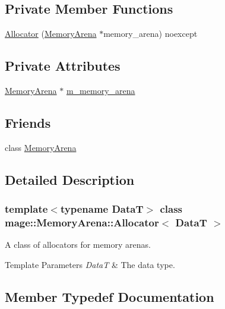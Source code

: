 \subsection*{Private Member Functions}
\begin{DoxyCompactItemize}
\item 
\hyperlink{classmage_1_1_memory_arena_1_1_allocator_a10a6ea82aab121d4e04efa004a49910b}{Allocator} (\hyperlink{classmage_1_1_memory_arena}{Memory\+Arena} $\ast$memory\+\_\+arena) noexcept
\end{DoxyCompactItemize}
\subsection*{Private Attributes}
\begin{DoxyCompactItemize}
\item 
\hyperlink{classmage_1_1_memory_arena}{Memory\+Arena} $\ast$ \hyperlink{classmage_1_1_memory_arena_1_1_allocator_aedfb429d9e7a6b59d9706183963c37ee}{m\+\_\+memory\+\_\+arena}
\end{DoxyCompactItemize}
\subsection*{Friends}
\begin{DoxyCompactItemize}
\item 
class \hyperlink{classmage_1_1_memory_arena_1_1_allocator_a934e79307a45b6e72da26d1f10079550}{Memory\+Arena}
\end{DoxyCompactItemize}


\subsection{Detailed Description}
\subsubsection*{template$<$typename DataT$>$\newline
class mage\+::\+Memory\+Arena\+::\+Allocator$<$ Data\+T $>$}

A class of allocators for memory arenas.


\begin{DoxyTemplParams}{Template Parameters}
{\em DataT} & The data type. \\
\hline
\end{DoxyTemplParams}


\subsection{Member Typedef Documentation}
\hypertarget{classmage_1_1_memory_arena_1_1_allocator_aa03d66542fcf507199911bca8b270bfc}{}\label{classmage_1_1_memory_arena_1_1_allocator_aa03d66542fcf507199911bca8b270bfc} 

